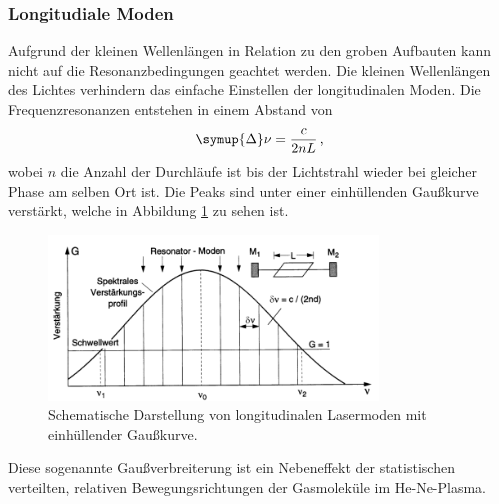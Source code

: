 \subsubsection{Longitudiale Moden}
Aufgrund der kleinen Wellenlängen in Relation zu den groben Aufbauten
kann nicht auf die Resonanzbedingungen geachtet werden.
Die kleinen Wellenlängen des Lichtes verhindern das einfache Einstellen der
longitudinalen Moden. Die Frequenzresonanzen entstehen in einem Abstand von
\begin{equation}
    \symup{\Delta}\nu = \frac{c}{2 n L} \, \text{,}
    \label{eqn:delnu}
\end{equation}
wobei $n$ die Anzahl der Durchläufe ist bis der Lichtstrahl wieder bei gleicher Phase am selben Ort ist.
Die Peaks sind unter einer einhüllenden Gaußkurve verstärkt, welche in Abbildung \ref{pic:kamm} zu sehen ist. 
\begin{figure}
    \centering
    \includegraphics[width = 0.78\textwidth]{pics/kamm.png}
    \caption{Schematische Darstellung von longitudinalen Lasermoden mit einhüllender Gaußkurve.\cite{Laserspektroskopie}}
    \label{pic:kamm}
\end{figure}
Diese sogenannte Gaußverbreiterung ist ein Nebeneffekt der statistischen verteilten,
relativen Bewegungsrichtungen der Gasmoleküle im He-Ne-Plasma.
\FloatBarrier

